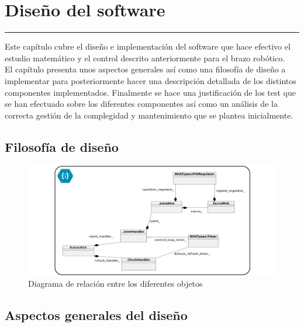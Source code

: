 \chapter{Diseño del software} \label{chap:SW}
\hrule
\vspace{3mm}

Este capítulo cubre el diseño e implementación del software que hace efectivo el estudio matemático y el control descrito anteriormente para el brazo robótico.
\\

El capítulo presenta unos aspectos generales así como una filosofía de diseño a implementar para posteriormente hacer una descripción detallada de los distintos componentes implementados. Finalmente se hace una justificación de los test que se han efectuado sobre los diferentes componentes así como un análisis de la correcta gestión de la complegidad y mantenimiento que se plantea inicialmente.

\section{Filosofía de diseño} \label{sec:SW:filosofia_diseno}


     \begin{figure}[H]
     	\centering
     	\includegraphics[width=1\textwidth]{figuras/Imagenes_SW/diagrama_clases_general.jpg}
     	\caption{Diagrama de relación entre los diferentes objetos}
     	\label{fig:SW:class_diagram_all}
     \end{figure}

\section{Aspectos generales del diseño} \label{sec:SW:diseno_general}

